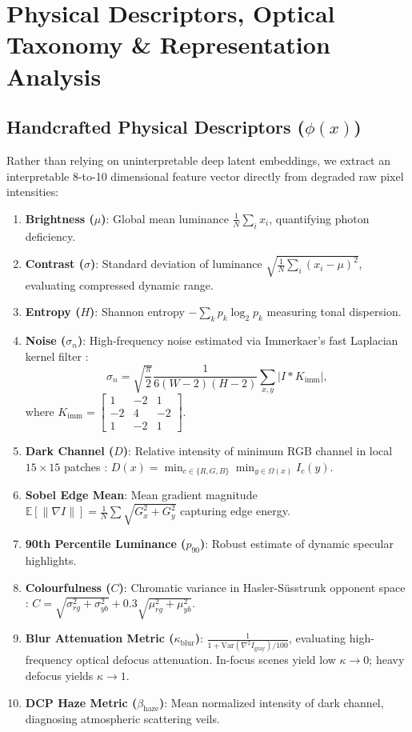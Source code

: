 \documentclass[journal]{IEEEtran}
\begin{document}
\section{Physical Descriptors, Optical Taxonomy \& Representation Analysis}

\subsection{Handcrafted Physical Descriptors (\texorpdfstring{$\phi(x)$}{phi(x)})}
Rather than relying on uninterpretable deep latent embeddings, we extract an interpretable 8-to-10 dimensional feature vector directly from degraded raw pixel intensities:
\begin{enumerate}
    \setlength{\itemsep}{1pt}
    \setlength{\parskip}{0pt}
    \item \textbf{Brightness ($\mu$)}: Global mean luminance $\frac{1}{N} \sum_i x_i$, quantifying photon deficiency.
    \item \textbf{Contrast ($\sigma$)}: Standard deviation of luminance $\sqrt{\frac{1}{N}\sum_i (x_i - \mu)^2}$, evaluating compressed dynamic range.
    \item \textbf{Entropy ($H$)}: Shannon entropy $-\sum_k p_k \log_2 p_k$ measuring tonal dispersion.
    \item \textbf{Noise ($\sigma_n$)}: High-frequency noise estimated via Immerkaer's fast Laplacian kernel filter \cite{chen2018learning}:
    \begin{equation}
    \sigma_n = \sqrt{\frac{\pi}{2}} \frac{1}{6(W-2)(H-2)} \sum_{x, y} |I * K_{\text{imm}}|,
    \end{equation}
    where $K_{\text{imm}} = \begin{bmatrix} 1 & -2 & 1 \\ -2 & 4 & -2 \\ 1 & -2 & 1 \end{bmatrix}$.
    \item \textbf{Dark Channel ($D$)}: Relative intensity of minimum RGB channel in local $15\times 15$ patches \cite{he2011single}: $D(x) = \min_{c \in \{R,G,B\}} \min_{y \in \Omega(x)} I_c(y)$.
    \item \textbf{Sobel Edge Mean}: Mean gradient magnitude $\mathbb{E}[\|\nabla I\|] = \frac{1}{N} \sum \sqrt{G_x^2 + G_y^2}$ capturing edge energy.
    \item \textbf{90th Percentile Luminance ($p_{90}$)}: Robust estimate of dynamic specular highlights.
    \item \textbf{Colourfulness ($C$)}: Chromatic variance in Hasler-S{\"u}sstrunk opponent space \cite{hasler2003measuring}: $C = \sqrt{\sigma_{rg}^2 + \sigma_{yb}^2} + 0.3 \sqrt{\mu_{rg}^2 + \mu_{yb}^2}$.
    \item \textbf{Blur Attenuation Metric ($\kappa_{\text{blur}}$)}: $\frac{1}{1 + \text{Var}(\nabla^2 I_{\text{gray}})/100}$, evaluating high-frequency optical defocus attenuation. In-focus scenes yield low $\kappa \to 0$; heavy defocus yields $\kappa \to 1$.
    \item \textbf{DCP Haze Metric ($\beta_{\text{haze}}$)}: Mean normalized intensity of dark channel, diagnosing atmospheric scattering veils.
\end{enumerate}
\end{document}
